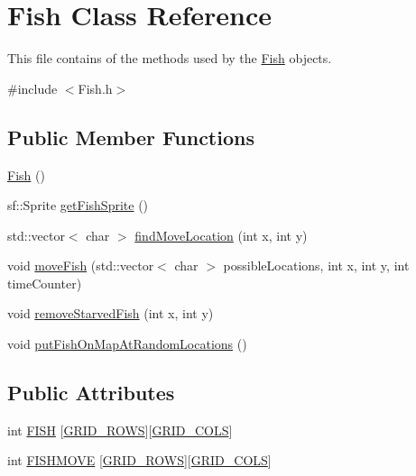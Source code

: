 \hypertarget{class_fish}{}\section{Fish Class Reference}
\label{class_fish}


This file contains of the methods used by the \hyperlink{class_fish}{Fish} objects.  




{\ttfamily \#include $<$Fish.\+h$>$}

\subsection*{Public Member Functions}
\begin{DoxyCompactItemize}
\item 
\hyperlink{class_fish_a265fa9dc23037b5f621ff5f2b2731e9b}{Fish} ()
\item 
sf\+::\+Sprite \hyperlink{class_fish_ae23421c4d781b462050c28d085701383}{get\+Fish\+Sprite} ()
\item 
std\+::vector$<$ char $>$ \hyperlink{class_fish_a89b819c754df5cdfd6b403aac953d826}{find\+Move\+Location} (int x, int y)
\item 
void \hyperlink{class_fish_a897b6f127f48eed86bdf9e76727e858b}{move\+Fish} (std\+::vector$<$ char $>$ possible\+Locations, int x, int y, int time\+Counter)
\item 
void \hyperlink{class_fish_a567bd1b821e032d36cdf81225452f57b}{remove\+Starved\+Fish} (int x, int y)
\item 
void \hyperlink{class_fish_a834b0a13a75ea8fa873c88a175c89133}{put\+Fish\+On\+Map\+At\+Random\+Locations} ()
\end{DoxyCompactItemize}
\subsection*{Public Attributes}
\begin{DoxyCompactItemize}
\item 
int \hyperlink{class_fish_ab77a195537e7505d26b3347a4a4d2776}{F\+I\+SH} \mbox{[}\hyperlink{_config_8h_a5ba0b105774bfdc09ce545d73dcdedd3}{G\+R\+I\+D\+\_\+\+R\+O\+WS}\mbox{]}\mbox{[}\hyperlink{_config_8h_a881e2cda79b5951641b07f678f6ef929}{G\+R\+I\+D\+\_\+\+C\+O\+LS}\mbox{]}
\item 
int \hyperlink{class_fish_ac362bdf589cc5638f43a5449b6ed9c1f}{F\+I\+S\+H\+M\+O\+VE} \mbox{[}\hyperlink{_config_8h_a5ba0b105774bfdc09ce545d73dcdedd3}{G\+R\+I\+D\+\_\+\+R\+O\+WS}\mbox{]}\mbox{[}\hyperlink{_config_8h_a881e2cda79b5951641b07f678f6ef929}{G\+R\+I\+D\+\_\+\+C\+O\+LS}\mbox{]}
\end{DoxyCompactItemize}



